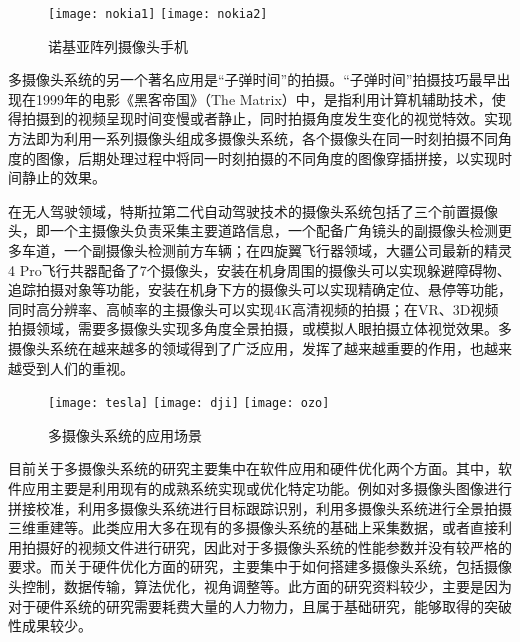 \begin{figure}[h]
  \centering%
    {\texttt{[image: nokia1]}}
    {\texttt{[image: nokia2]}}
  \caption{诺基亚阵列摄像头手机}
  \label{nokia}
\end{figure}

多摄像头系统的另一个著名应用是“子弹时间”的拍摄。“子弹时间”拍摄技巧最早出现在1999年的电影《黑客帝国》（The Matrix）中，是指利用计算机辅助技术，使得拍摄到的视频呈现时间变慢或者静止，同时拍摄角度发生变化的视觉特效。实现方法即为利用一系列摄像头组成多摄像头系统，各个摄像头在同一时刻拍摄不同角度的图像，后期处理过程中将同一时刻拍摄的不同角度的图像穿插拼接，以实现时间静止的效果。

在无人驾驶领域，特斯拉第二代自动驾驶技术的摄像头系统包括了三个前置摄像头，即一个主摄像头负责采集主要道路信息，一个配备广角镜头的副摄像头检测更多车道，一个副摄像头检测前方车辆；在四旋翼飞行器领域，大疆公司最新的精灵4 Pro飞行共器配备了7个摄像头，安装在机身周围的摄像头可以实现躲避障碍物、追踪拍摄对象等功能，安装在机身下方的摄像头可以实现精确定位、悬停等功能，同时高分辨率、高帧率的主摄像头可以实现4K高清视频的拍摄；在VR、3D视频拍摄领域，需要多摄像头实现多角度全景拍摄，或模拟人眼拍摄立体视觉效果。多摄像头系统在越来越多的领域得到了广泛应用，发挥了越来越重要的作用，也越来越受到人们的重视。

\begin{figure}[h]
  \centering%
    {\texttt{[image: tesla]}}
    {\texttt{[image: dji]}}
    {\texttt{[image: ozo]}}
  \caption{多摄像头系统的应用场景}
  \label{camera}
\end{figure}


目前关于多摄像头系统的研究主要集中在软件应用和硬件优化两个方面。其中，软件应用主要是利用现有的成熟系统实现或优化特定功能。例如对多摄像头图像进行拼接校准，利用多摄像头系统进行目标跟踪识别，利用多摄像头系统进行全景拍摄三维重建等。此类应用大多在现有的多摄像头系统的基础上采集数据，或者直接利用拍摄好的视频文件进行研究，因此对于多摄像头系统的性能参数并没有较严格的要求。而关于硬件优化方面的研究，主要集中于如何搭建多摄像头系统，包括摄像头控制，数据传输，算法优化，视角调整等。此方面的研究资料较少，主要是因为对于硬件系统的研究需要耗费大量的人力物力，且属于基础研究，能够取得的突破性成果较少。

